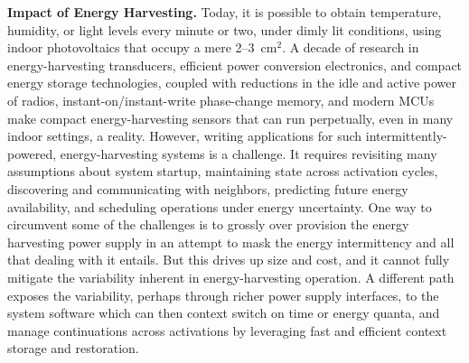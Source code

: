 %

\smallskip\noindent
\textbf{Impact of Energy Harvesting.}
Today, it is possible to obtain temperature, humidity, or light levels every
minute or two, under dimly lit conditions, using indoor photovoltaics that
occupy a mere 2--3~cm$^2$.
A decade of research in energy-harvesting transducers, efficient power
conversion electronics, and compact energy storage technologies, coupled
with reductions in the idle and active power of radios,
instant-on/instant-write phase-change memory, and modern MCUs make compact
energy-harvesting sensors that can run perpetually, even in many indoor
settings, a reality.
%
However, writing applications for such intermittently-powered,
energy-harvesting systems is a challenge.  It requires revisiting many
assumptions about system startup, maintaining state across activation cycles,
discovering and communicating with neighbors, predicting future energy
availability, and scheduling operations under energy uncertainty.  One way to
circumvent some of the challenges is to grossly over provision the energy
harvesting power supply in an attempt to mask the energy intermittency and all
that dealing with it entails.  But this drives up size and cost, and it cannot
fully mitigate the variability inherent in energy-harvesting operation.  A
different path exposes the variability, perhaps through richer power supply
interfaces, to the system software which can then context switch on time or
energy quanta, and manage continuations across activations by leveraging fast
and efficient context storage and restoration.

